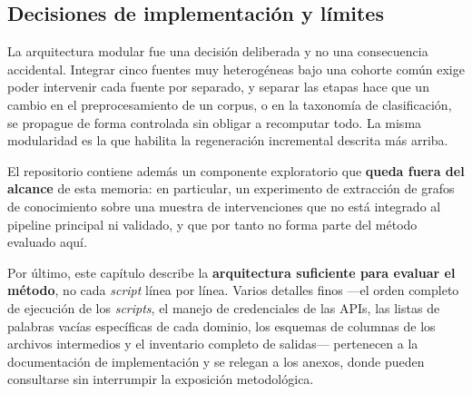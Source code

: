 \subsection{Decisiones de implementación y límites}
\label{sec:arq-decisiones}

La arquitectura modular fue una decisión deliberada y no una consecuencia
accidental. Integrar cinco fuentes muy heterogéneas bajo una cohorte común exige
poder intervenir cada fuente por separado, y separar las etapas hace que un
cambio en el preprocesamiento de un corpus, o en la taxonomía de clasificación,
se propague de forma controlada sin obligar a recomputar todo. La misma
modularidad es la que habilita la regeneración incremental descrita más arriba.

El repositorio contiene además un componente exploratorio que \textbf{queda
fuera del alcance} de esta memoria: en particular, un experimento de extracción
de grafos de conocimiento sobre una muestra de intervenciones que no está
integrado al pipeline principal ni validado, y que por tanto no forma parte del
método evaluado aquí.

Por último, este capítulo describe la \textbf{arquitectura suficiente para
evaluar el método}, no cada \emph{script} línea por línea. Varios detalles finos
---el orden completo de ejecución de los \emph{scripts}, el manejo de
credenciales de las APIs, las listas de palabras vacías específicas de cada
dominio, los esquemas de columnas de los archivos intermedios y el inventario
completo de salidas--- pertenecen a la documentación de implementación y se
relegan a los anexos, donde pueden consultarse sin interrumpir la exposición
metodológica.
